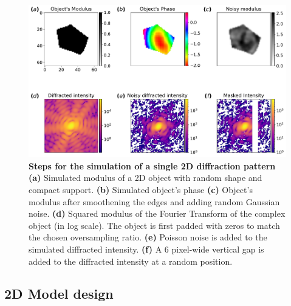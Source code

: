 \begin{figure}[h]
    \includegraphics[width=\textwidth]{figures/Inpainting/2D_dataset_creation.pdf}
    \caption{\textbf{Steps for the simulation of a single 2D diffraction pattern} 
    \textbf{(a)} Simulated modulus of a 2D object with random shape and compact support. \textbf{(b)} Simulated object's phase
    \textbf{(c)} Object's modulus after smoothening the edges and adding random Gaussian noise. \textbf{(d)} Squared modulus of the Fourier Transform
    of the complex object (in log scale). The object is first padded with zeros to match the chosen oversampling ratio.
    \textbf{(e)} Poisson noise is added to the simulated diffracted intensity. \textbf{(f)} A 6 pixel-wide
    vertical gap is added to the diffracted intensity at a random position.}
    \label{fig:2D_dataset_creation}
\end{figure}


\subsection{2D Model design}

